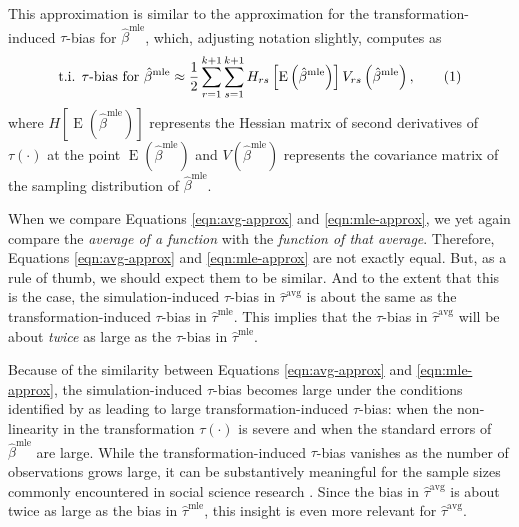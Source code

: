 \documentclass[11pt]{article}
\newcommand\numberthis{\addtocounter{equation}{1}\tag{\theequation}}
\DeclareMathOperator*{\E}{\text{E}}
\begin{document}
This approximation is similar to the approximation for the transformation-induced $\tau$-bias for $\hat{\beta}^\text{mle}$, which, adjusting notation slightly, \citet[p. 405, Eq. 1]{Rainey2017} computes as
\begin{align*}
\text{t.i. } \tau \text{-bias for } \hat{\beta}^\text{mle} \approx \dfrac{1}{2} \displaystyle \sum_{r = 1}^{k+1} \sum_{s = 1}^{k+1} H_{rs}\left[ \E \left( \hat{\beta}^\text{mle} \right) \right] V_{rs} \left( \hat{\beta}^{\text{mle}} \right), \numberthis \label{eqn:mle-approx}
\end{align*}
where $H\left[ \E \left( \hat{\beta}^\text{mle} \right) \right]$ represents the Hessian matrix of second derivatives of $\tau(\cdot)$ at the point $\E \left( \hat{\beta}^\text{mle} \right)$ and $V \left( \hat{\beta}^{\text{mle}} \right)$ represents the covariance matrix of the sampling distribution of $\hat{\beta}^\text{mle}$.

When we compare Equations \ref{eqn:avg-approx} and \ref{eqn:mle-approx}, we yet again compare the \textit{average of a function} with the \textit{function of that average}.
Therefore, Equations \ref{eqn:avg-approx} and \ref{eqn:mle-approx} are not exactly equal.
But, as a rule of thumb, we should expect them to be similar.
And to the extent that this is the case, the simulation-induced $\tau$-bias in $\hat{\tau}^\text{avg}$ is about the same as the transformation-induced $\tau$-bias in $\hat{\tau}^\text{mle}$. This implies that the $\tau$-bias in $\hat{\tau}^\text{avg}$ will be about \emph{twice} as large as the $\tau$-bias in $\hat{\tau}^\text{mle}$.


Because of the similarity between Equations \ref{eqn:avg-approx} and \ref{eqn:mle-approx}, the simulation-induced $\tau$-bias becomes large under the conditions identified by \cite{Rainey2017} as leading to large transformation-induced $\tau$-bias: when the non-linearity in the transformation $\tau(\cdot)$ is severe and when the standard errors of $\hat{\beta}^\text{mle}$ are large.
While the transformation-induced $\tau$-bias vanishes as the number of observations grows large, it can be substantively meaningful for the sample sizes commonly encountered in social science research \citep{Rainey2017}. Since the bias in $\hat{\tau}^\text{avg}$ is about twice as large as the bias in $\hat{\tau}^\text{mle}$, this insight is even more relevant for $\hat{\tau}^\text{avg}$.
\end{document}
